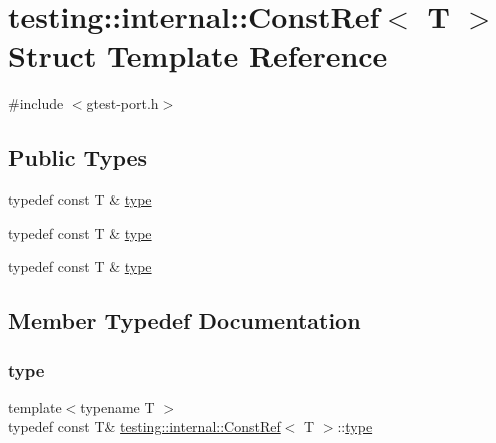 \hypertarget{structtesting_1_1internal_1_1_const_ref}{}\section{testing\+::internal\+::Const\+Ref$<$ T $>$ Struct Template Reference}
\label{structtesting_1_1internal_1_1_const_ref}


{\ttfamily \#include $<$gtest-\/port.\+h$>$}

\subsection*{Public Types}
\begin{DoxyCompactItemize}
\item 
typedef const T \& \mbox{\hyperlink{structtesting_1_1internal_1_1_const_ref_a53610a4d0e72958332222b0a85f8937a}{type}}
\item 
typedef const T \& \mbox{\hyperlink{structtesting_1_1internal_1_1_const_ref_a53610a4d0e72958332222b0a85f8937a}{type}}
\item 
typedef const T \& \mbox{\hyperlink{structtesting_1_1internal_1_1_const_ref_a53610a4d0e72958332222b0a85f8937a}{type}}
\end{DoxyCompactItemize}


\subsection{Member Typedef Documentation}
\mbox{\label{structtesting_1_1internal_1_1_const_ref_a53610a4d0e72958332222b0a85f8937a}} 
\subsubsection{\texorpdfstring{type}{type}\hspace{0.1cm}{\footnotesize\ttfamily [1/3]}}
{\footnotesize\ttfamily template$<$typename T $>$ \\
typedef const T\& \mbox{\hyperlink{structtesting_1_1internal_1_1_const_ref}{testing\+::internal\+::\+Const\+Ref}}$<$ T $>$\+::\mbox{\hyperlink{structtesting_1_1internal_1_1_const_ref_a53610a4d0e72958332222b0a85f8937a}{type}}}

